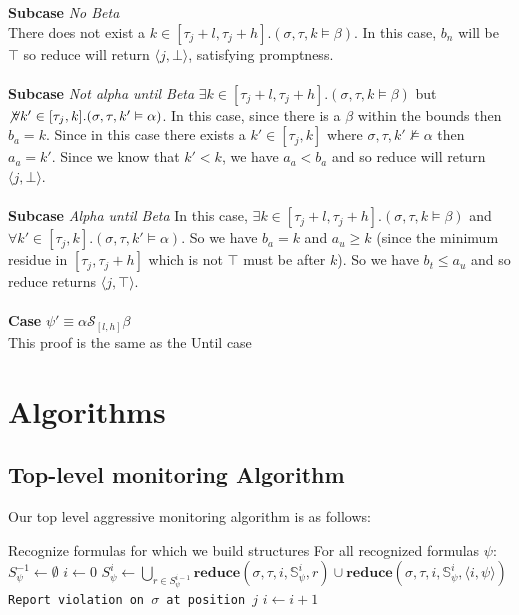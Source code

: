 \documentclass[10pt,a4paper]{article}
\newcommand{\rp}[2]{\ensuremath{\langle #1, #2 \rangle}}
\begin{document}
\noindent \textbf{Subcase} \textit{No Beta} \\
There does not exist a $k \in [\tau_j+l,\tau_j+h].(\sigma,\tau,k \vDash \beta)$. In this case, $b_n$ will be $\top$ so reduce will return $\rp{j}{\bot}$, satisfying promptness.
\\ \\
\noindent \textbf{Subcase} \textit{Not alpha until Beta} 
$\exists k \in [\tau_j+l,\tau_j+h].(\sigma,\tau,k \vDash \beta)$ but $\not\forall k' \in [\tau_j,k].(\sigma, \tau, k' \vDash \alpha)$. In this case, since there is a $\beta$ within the bounds then $b_a = k$. Since in this case there exists a $k' \in [\tau_j,k]$ where $\sigma,\tau, k' \nvDash \alpha$ then $a_a = k'$. Since we know that $k' < k$, we have $a_a < b_a$ and so reduce will return $\rp{j}{\bot}$.
\\ \\
\noindent \textbf{Subcase} \textit{Alpha until Beta} 
In this case, $\exists k \in [\tau_j+l,\tau_j+h].(\sigma,\tau,k\vDash \beta)$ and $\forall k' \in [\tau_j,k].(\sigma,\tau,k' \vDash \alpha)$. So we have $b_a = k$ and $a_u \geq k$ (since the minimum residue in $[\tau_j,\tau_j+h]$ which is not $\top$ must be after $k$). So we have $b_t \leq a_u$ and so reduce returns $\rp{j}{\top}$.
\\ \\ %
\noindent \textbf{Case} $\psi' \equiv \alpha \mathcal{S}_{[l,h]} \beta$ \\
This proof is the same as the Until case

\pagebreak
\section{Algorithms}
\subsection{Top-level monitoring Algorithm}
Our top level aggressive monitoring algorithm is as follows:

\begin{algorithmic}[1]
\STATE Recognize formulas for which we build structures
\STATE For all recognized formulas $\psi$: $S^{-1}_{\psi} \leftarrow \emptyset$
\STATE $i \leftarrow 0$
\LOOP
{}
	\STATE $S^i_{\psi} \leftarrow \bigcup\limits_{r \in S^{i-1}_{\psi}} \mathbf{reduce}(\sigma, \tau, i, \mathbb{S}^i_{\psi}, r) \cup \mathbf{reduce}(\sigma, \tau, i, \mathbb{S}^i_{\psi}, \rp{i}{\psi})$
\ENDFOR
\FOR{all $\rp{j}{\bot} \in S^i_{\varphi}$}
\STATE \texttt{Report violation on $\sigma$ at position $j$}
\ENDFOR
\STATE $i \leftarrow i + 1$
\ENDLOOP
\end{algorithmic}
\end{document}
